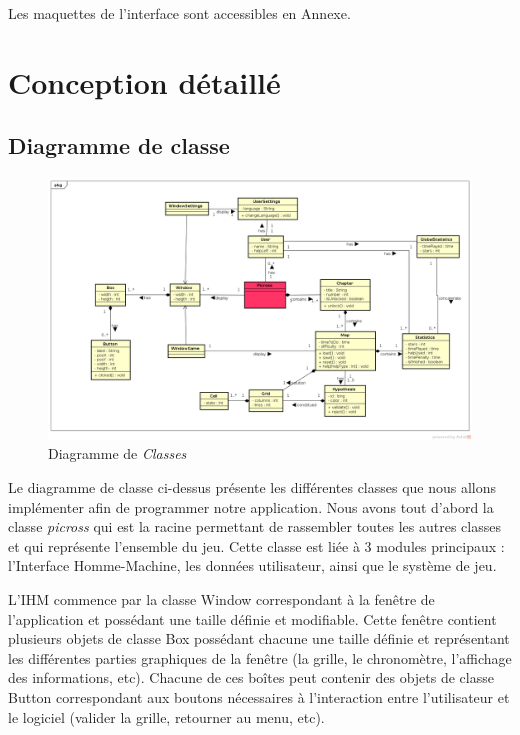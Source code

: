 \documentclass{report}
\begin{document}
  Les maquettes de l'interface sont accessibles en Annexe.
  
  
			
\chapter{Conception détaillé}

    \section{Diagramme de classe}
    
    \begin{figure}[H]
	\caption{Diagramme de \textit{Classes}}
	\includegraphics[width=17cm]{../UML/Class_diagram/DiagrammeClasse.png}
    \end{figure}
    
    	
	Le diagramme de classe ci-dessus présente les différentes classes que nous allons implémenter afin de programmer notre application. Nous avons tout d’abord la classe \textit{picross} qui est la racine permettant de rassembler toutes les autres classes et qui représente l’ensemble du jeu. Cette classe est liée à 3 modules principaux : l’Interface Homme-Machine, les données utilisateur, ainsi que le système de jeu.

	L’IHM commence par la classe Window correspondant à la fenêtre de l’application et possédant une taille définie et modifiable. Cette fenêtre contient plusieurs objets de classe Box possédant chacune une taille définie et représentant les différentes parties graphiques de la fenêtre (la grille, le chronomètre, l’affichage des informations, etc). Chacune de ces boîtes peut contenir des objets de classe Button correspondant aux boutons nécessaires à l’interaction entre l’utilisateur et le logiciel (valider la grille, retourner au menu, etc).
\end{document}
